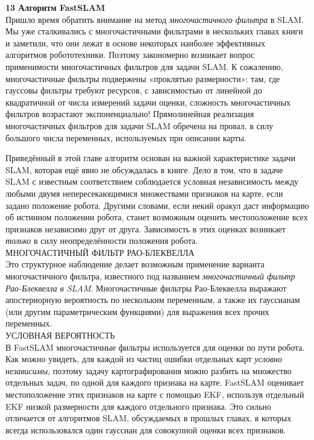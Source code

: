\documentclass[10pt,a4paper]{article}
\begin{document}
\textbf{13 Алгоритм FastSLAM}\\

Пришло время обратить внимание на метод \textit{многочастичного фильтра} в SLAM. Мы уже сталкивались с многочастичными фильтрами в нескольких главах книги и заметили, что они лежат в основе некоторых наиболее эффективных алгоритмов робототехники. Поэтому закономерно возникает вопрос применимости многочастичных фильтров для задачи SLAM. К сожалению, многочастичные фильтры подвержены «проклятью размерности»: там, где гауссовы фильтры требуют ресурсов, с зависимостью от линейной до квадратичной от числа измерений задачи оценки, сложность многочастичных фильтров возрастают экспоненциально! Прямолинейная реализация многочастичных фильтров для задачи SLAM обречена на провал, в силу большого числа переменных, используемых при описании карты.

Приведённый в этой главе алгоритм основан на важной характеристике задачи SLAM, которая ещё явно не обсуждалась в книге. Дело в том, что в задаче SLAM с известным соответствием соблюдается условная независимость между любыми двумя непересекающимися множествами признаков на карте, если задано положение робота. Другими словами, если некий оракул даст информацию об истинном положении робота, станет возможным оценить местоположение всех признаков независимо друг от друга. Зависимость в этих оценках возникает \textit{только} в силу неопределённости положения робота.\\

МНОГОЧАСТИЧНЫЙ ФИЛЬТР РАО-БЛЕКВЕЛЛА\\

Это структурное наблюдение делает возможным применение варианта многочастичного фильтра, известного под названием  \textit{многочастичный фильтр Рао-Блеквелла в SLAM}. Многочастичные фильтры Рао-Блеквелла выражают апостериорную вероятность по нескольким переменным, а также их гауссианам (или другим параметрическим функциями) для выражения всех прочих переменных.\\

УСЛОВНАЯ ВЕРОЯТНОСТЬ\\

В FastSLAM  многочастичные фильтры используется для оценки по пути робота. Как можно увидеть, для каждой из частиц ошибки отдельных карт \textit{условно независимы}, поэтому задачу картографирования можно разбить на множество отдельных задач, по одной для каждого признака на карте. FastSLAM оценивает местоположение этих признаков на карте с помощью EKF, используя отдельный EKF низкой размерности для каждого отдельного признака. Это сильно отличается от алгоритмов SLAM, обсуждаемых в прошлых главах, в которых всегда использовался один гауссиан для совокупной оценки всех признаков.
\end{document}
